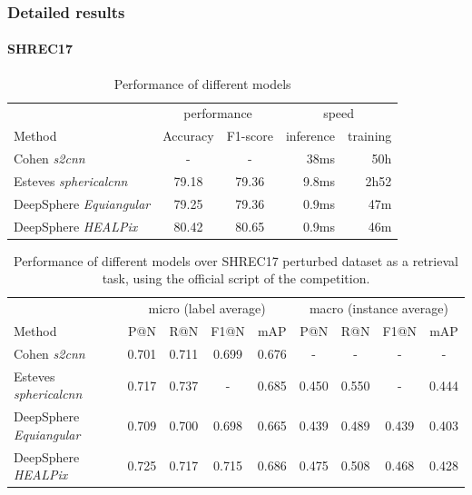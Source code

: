 \documentclass{article} %
\begin{document}
\subsubsection*{Detailed results}
\paragraph*{SHREC17}

\begin{table}
    \centering
    \begin{tabular}{l|c c r r}
        \multicolumn{1}{l}{} & \multicolumn{2}{c}{performance} & \multicolumn{2}{c}{speed}\\
        \cmidrule(lr){2-3} \cmidrule(lr){4-5}
        \multicolumn{1}{l}{Method} & Accuracy & F1-score & inference & training \\ \hline
        Cohen \emph{s2cnn} & - & - & 38ms & 50h\\
        Esteves \emph{sphericalcnn} & 79.18 & 79.36 & 9.8ms & 2h52\\ \hline
        DeepSphere \emph{Equiangular} & 79.25 & 79.36 & 0.9ms & 47m \\
        DeepSphere \emph{HEALPix} & 80.42 & 80.65 & 0.9ms & 46m\\
    \end{tabular}
    \caption{Performance of different models}
    \label{tab:SHREC17_class}
\end{table}

\begin{table}
    \centering
    \begin{tabular}{l|c c c c|c c c c}
     & \multicolumn{4}{c|}{micro (label average)} & \multicolumn{4}{c}{macro (instance average)} \\
    Method & P@N & R@N & F1@N & mAP & P@N & R@N & F1@N & mAP \\ \hline
    Cohen \emph{s2cnn} & 0.701 & 0.711 & 0.699 & 0.676 & - & - & - & - \\
    Esteves \emph{sphericalcnn} & 0.717 & 0.737 & - & 0.685 & 0.450 & 0.550 & - & 0.444\\ \hline
    DeepSphere \emph{Equiangular} & 0.709 & 0.700 & 0.698 & 0.665 & 0.439 & 0.489 & 0.439 & 0.403 \\
    DeepSphere \emph{HEALPix} & 0.725 & 0.717 & 0.715 & 0.686 & 0.475 & 0.508 & 0.468 & 0.428\\
    \end{tabular}
    \caption{Performance of different models over SHREC17 perturbed dataset as a retrieval task, using the official script of the competition.}
    \label{tab:SHREC17_retriev}
\end{table}
\end{document}
